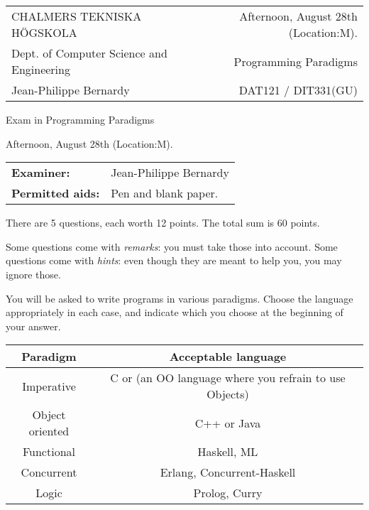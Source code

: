 \documentclass{article}
\begin{document}
\setlength{\parskip}{2pt}

\newcommand{\examtime}{Afternoon, August 28th  (Location:M)}
\newcommand{\points}[1]{\marginpar{\bf #1 points}}
\noindent
\begin{tabular}{lr}
CHALMERS TEKNISKA H\"OGSKOLA &\examtime{}.\\
Dept. of Computer Science and Engineering & Programming Paradigms\\
Jean-Philippe Bernardy                 & DAT121 / DIT331(GU) \\
\end{tabular}

\vspace{2.5cm} \noindent
\begin{center} {\LARGE
Exam in Programming Paradigms}
\end{center}

\vspace{1.5cm}

\noindent
\examtime{}.\\
\begin{tabular}{ll}
\textbf{Examiner:} & Jean-Philippe Bernardy \\
\textbf{Permitted aids:} & Pen and blank paper.
\end{tabular}
\vspace{1cm}

\noindent

There are 5 questions, each worth 12 points. The total sum is 60
points.

Some questions come with \emph{remarks}: you must take those
into account.
Some questions come with \emph{hints}: even though they are meant to help you, you may ignore those.

You will be asked to write programs in various paradigms. Choose the
language appropriately in each case, and indicate which you choose at
the beginning of your answer.

\begin{tabular}[p]{cc}
  Paradigm & Acceptable language \\ \hline
  Imperative   & C or (an OO language where you refrain to use Objects) \\
  Object oriented & C++ or Java \\
  Functional & Haskell, ML \\
  Concurrent & Erlang, Concurrent-Haskell \\
  Logic & Prolog, Curry
\end{tabular}
\end{document}

